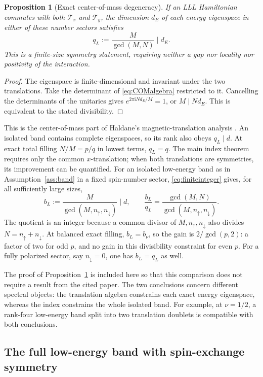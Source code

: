 \documentclass[11pt]{article}
\newtheorem{proposition}[theorem]{Proposition}
\theoremstyle{definition}
\theoremstyle{remark}
\newcommand{\ii}{\mathrm i}
\newcommand{\up}{\uparrow}
\newcommand{\dn}{\downarrow}
\begin{document}
\begin{proposition}[Exact center-of-mass degeneracy]
\label{prop:COM}
If an LLL Hamiltonian commutes with both \(\mathcal T_x\) and
\(\mathcal T_y\), the dimension \(d_E\) of each energy eigenspace
in either of these number sectors satisfies
\[
 q_L:=\frac{M}{\gcd(M,N)}\mid d_E.
\]
This is a finite-size symmetry statement, requiring neither a
gap nor locality nor positivity of the interaction.
\end{proposition}
\begin{proof}
The eigenspace is finite-dimensional and invariant under the two
translations.  Take the determinant of \eqref{eq:COMalgebra}
restricted to it.  Cancelling the determinants of the unitaries
gives \(e^{2\pi\ii Nd_E/M}=1\), or \(M\mid Nd_E\).
This is equivalent to the stated divisibility.
\end{proof}

This is the center-of-mass part of Haldane's magnetic-translation
analysis \cite{Haldane85}.  An isolated band contains complete
eigenspaces, so its rank also obeys \(q_L\mid d\).
At exact total filling \(N/M=p/q\) in lowest terms, \(q_L=q\).
The main index theorem requires
only the common \(x\)-translation; when both translations are
symmetries, its improvement can be quantified.  For an isolated
low-energy band as in Assumption~\ref{ass:band} in a fixed spin-number sector,
\eqref{eq:finiteinteger} gives, for all sufficiently large sizes,
\[
 b_L:=\frac{M}{\gcd(M,n_\up,n_\dn)}\mid d,
 \qquad
 \frac{b_L}{q_L}
    =\frac{\gcd(M,N)}{\gcd(M,n_\up,n_\dn)}.
\]
The quotient is an integer because a common divisor of
\(M,n_\up,n_\dn\) also divides \(N=n_\up+n_\dn\).
At balanced exact filling, \(b_L=b_\nu\), so the gain is
\(2/\gcd(p,2)\): a factor of two for odd \(p\), and no gain
in this divisibility constraint for even \(p\).
For a fully polarized sector, say \(n_\dn=0\), one has
\(b_L=q_L\) as well.

The proof of Proposition~\ref{prop:COM} is included here so that
this comparison does not require a result from the cited paper.
The two conclusions concern different spectral objects: the
translation algebra constrains each exact energy eigenspace,
whereas the index constrains the whole isolated band.  For
example, at \(\nu=1/2\), a rank-four low-energy band split into
two translation doublets is compatible with both conclusions.

\subsection{The full low-energy band with spin-exchange symmetry}
\end{document}
